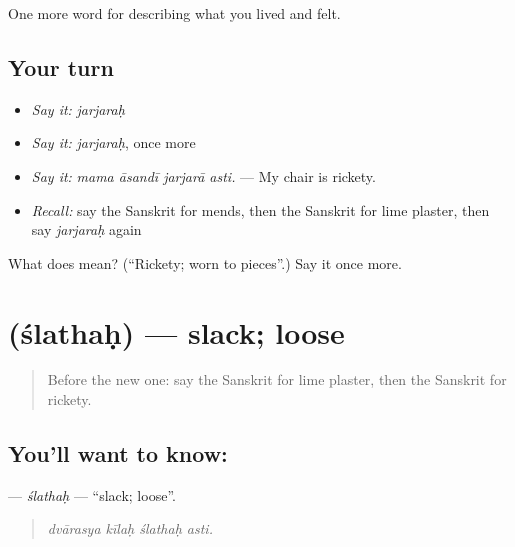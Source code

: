 \begin{grammarlens}[title={What you've built}]
One more word for describing what you lived and felt.
\end{grammarlens}

\subsection*{Your turn}
\begin{itemize}
\raggedright
  \item \emph{Say it:} \emph{jarjaraḥ}
  \item \emph{Say it:} \emph{jarjaraḥ}, once more
  \item \emph{Say it:} \emph{mama āsandī jarjarā asti.} — My chair is rickety.
  \item \emph{Recall:} say the Sanskrit for mends, then the Sanskrit for lime plaster, then say \emph{jarjaraḥ} again
\end{itemize}

\begin{tcolorbox}[breakable,colback=teal!4,colframe=teal!35!black,title={Before you move on}]
What does  mean? (\textquotedblleft{}Rickety; worn to pieces\textquotedblright{}.) Say it once more.
\end{tcolorbox}
\section[\texorpdfstring{\sk{श्लथः} (ślathaḥ)}{श्लथः (ślathaḥ)}]{ (ślathaḥ) — slack; loose}

\label{lesson:SA-C509-slathah}



\begin{quote}
Before the new one: say the Sanskrit for lime plaster, then the Sanskrit for rickety.
\end{quote}

\subsection*{You'll want to know: }
\textbf{} — \emph{ślathaḥ} — \textquotedblleft{}slack; loose\textquotedblright{}.

\begin{quote}
   
\end{quote}

\begin{quote}
\emph{dvārasya kīlaḥ ślathaḥ asti.}
\end{quote}

